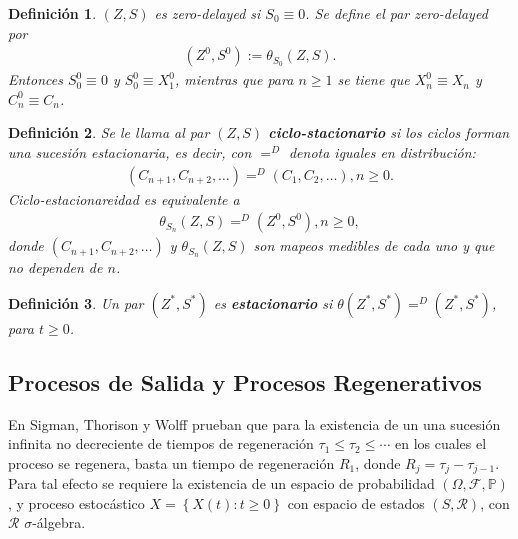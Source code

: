 \documentclass{article}
\newtheorem{Def}{Definición}[section]
\newcommand{\prob}{\mathbb{P}}
\numberwithin{equation}{section}
\begin{document}
\begin{Def}
$\left(Z,S\right)$ es \textit{zero-delayed} si $S_{0}\equiv0$. Se define el par \textit{zero-delayed} por
\begin{eqnarray}
\left(Z^{0},S^{0}\right):=\theta_{S_{0}}\left(Z,S\right).
\end{eqnarray}
Entonces $S_{0}^{0}\equiv0$ y $S_{0}^{0}\equiv X_{1}^{0}$, mientras que para $n\geq1$ se tiene que $X_{n}^{0}\equiv X_{n}$ y $C_{n}^{0}\equiv C_{n}$.
\end{Def}

\begin{Def}
Se le llama al par $\left(Z,S\right)$ \textbf{ciclo-stacionario} si los ciclos forman una sucesi\'on estacionaria, es decir, con $=^{D}$ denota iguales en distribuci\'on:
\begin{eqnarray}
\left(C_{n+1},C_{n+2},\ldots\right)=^{D}\left(C_{1},C_{2},\ldots\right),n\geq0.
\end{eqnarray}
Ciclo-estacionareidad es equivalente a 
\begin{eqnarray}
\theta_{S_{n}}\left(Z,S\right)=^{D}
\left(Z^{0},S^{0}\right),n\geq0,
\end{eqnarray}
donde $\left(C_{n+1},C_{n+2},\ldots\right)$ y $\theta_{S_{n}}\left(Z,S\right)$ son mapeos medibles de cada uno y que no dependen de $n$.
\end{Def}

\begin{Def}
Un par $\left(Z^{*},S^{*}\right)$ es \textbf{estacionario} si $\theta\left(Z^{*},S^{*}\right)=^{D}
\left(Z^{*},S^{*}\right)$, para $t\geq0$.
\end{Def}


%
\subsection{Procesos de Salida y Procesos Regenerativos}\label{Resultados.Salida}
%
En Sigman, Thorison y Wolff \cite{Sigman2} prueban que para la existencia de un una sucesi\'on infinita no decreciente de tiempos de regeneraci\'on $\tau_{1}\leq\tau_{2}\leq\cdots$ en los cuales el proceso se regenera, basta un tiempo de regeneraci\'on $R_{1}$, donde $R_{j}=\tau_{j}-\tau_{j-1}$. Para tal efecto se requiere la existencia de un espacio de probabilidad $\left(\Omega,\mathcal{F},\prob\right)$, y proceso estoc\'astico $\textit{X}=\left\{X\left(t\right):t\geq0\right\}$ con espacio de estados $\left(S,\mathcal{R}\right)$, con $\mathcal{R}$ $\sigma$-\'algebra.
\end{document}
